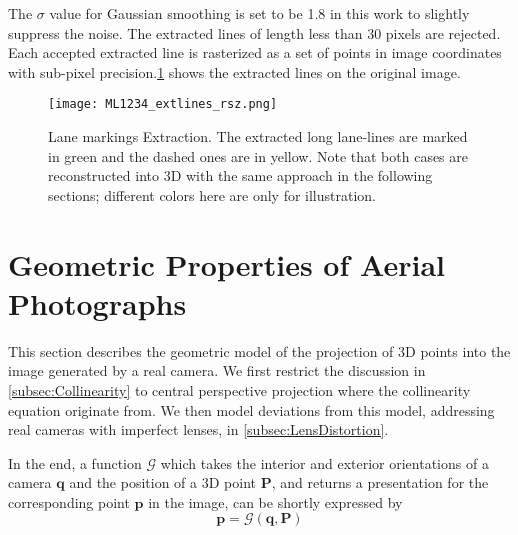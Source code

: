 The $\sigma$ value for Gaussian smoothing is set to be 1.8 in this work to slightly suppress the noise. The extracted lines of length less than 30 pixels are rejected. Each accepted extracted line is rasterized as a set of points in image coordinates with sub-pixel precision.\cref{fig:LineExtraction} shows the extracted lines on the original image.
\begin{figure}
  \centering
  \texttt{[image: ML1234\_extlines\_rsz.png]}
  \caption{Lane markings Extraction. The extracted long lane-lines are marked in green and the dashed ones are in yellow.  Note that both cases are reconstructed into 3D with the same approach in the following sections; different colors here are only for illustration.}
  \label{fig:LineExtraction}
\end{figure}

\section{Geometric Properties of Aerial Photographs}
\label{sec:Geometry}

This section describes the geometric model of the projection of 3D points into the image generated by a real camera. We first restrict the discussion in \cref{subsec:Collinearity} to central perspective projection where the collinearity equation originate from. We then model deviations from this model, addressing real cameras with imperfect lenses, in \cref{subsec:LensDistortion}.

In the end, a function $\mathcal{G}$ which takes the interior and exterior orientations of a camera $\mathbf{q}$ and the position of a 3D point $\mathbf{P}$, and returns a presentation for the corresponding point $\mathbf{p}$ in the image, can be shortly expressed by
\begin{equation} \label{eq:Gfunction}
\mathbf{p} = \mathcal{G}(\mathbf{q},\mathbf{P}) 
\end{equation}

